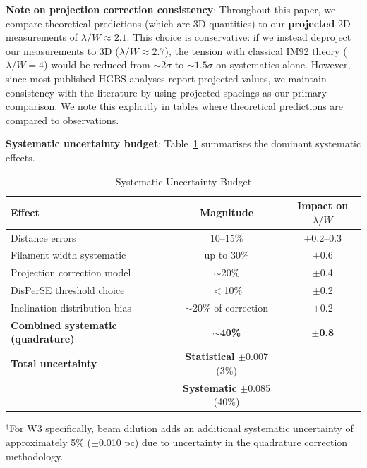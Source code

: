 \documentclass[11pt,a4paper]{article}
\begin{document}
\textbf{Note on projection correction consistency}: Throughout this paper, we compare theoretical predictions (which are 3D quantities) to our \textbf{projected} 2D measurements of $\lambda/W \approx 2.1$. This choice is conservative: if we instead deproject our measurements to 3D ($\lambda/W \approx 2.7$), the tension with classical IM92 theory ($\lambda/W = 4$) would be reduced from $\sim2\sigma$ to $\sim1.5\sigma$ on systematics alone. However, since most published HGBS analyses report projected values, we maintain consistency with the literature by using projected spacings as our primary comparison. We note this explicitly in tables where theoretical predictions are compared to observations.

\textbf{Systematic uncertainty budget}: Table~\ref{tab:uncertainties} summarises the dominant systematic effects.

\begin{table}[H]
\centering
\caption{Systematic Uncertainty Budget}
\label{tab:uncertainties}
\begin{tabular}{lcc}
\toprule
Effect & Magnitude & Impact on $\lambda/W$ \\
\midrule
Distance errors & 10--15\% & $\pm$0.2--0.3 \\
Filament width systematic & up to 30\% & $\pm$0.6 \\
Projection correction model & $\sim$20\% & $\pm$0.4 \\
DisPerSE threshold choice & $<$10\% & $\pm$0.2 \\
Inclination distribution bias & $\sim$20\% of correction & $\pm$0.2 \\
\textbf{Combined systematic (quadrature)} & \textbf{$\sim$40\%} & \textbf{$\pm$0.8} \\
\midrule
\textbf{Total uncertainty} & \textbf{Statistical} $\pm$0.007 (3\%) & \\
& \textbf{Systematic} $\pm$0.085 (40\%) & \\
\bottomrule
\end{tabular}
\vspace{-0.5em}
\small{$^{\dagger}$For W3 specifically, beam dilution adds an additional systematic uncertainty of approximately 5\% ($\pm$0.010 pc) due to uncertainty in the quadrature correction methodology.}
\end{table}
\end{document}
